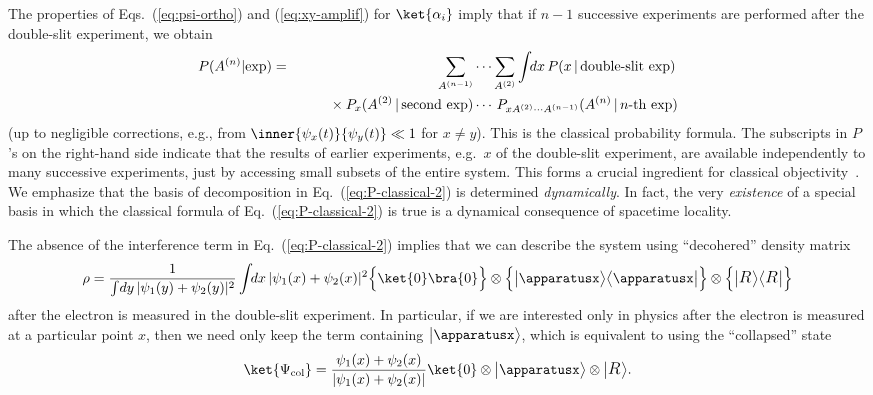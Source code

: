 \documentclass[12pt]{article}
\begin{document}
The properties of Eqs.~(\ref{eq:psi-ortho}) and (\ref{eq:xy-amplif}) 
for $\ket{\alpha_i}$ imply that if $n-1$ successive experiments are 
performed after the double-slit experiment, we obtain
%
\begin{eqnarray}
  P(A^{(n)}|{\rm exp}) &=& \sum_{A^{(n-1)}} \cdots \sum_{A^{(2)}} 
    \int\!\!dx\, P(x \,|\, \mbox{double-slit exp})\, 
\nonumber\\
  && {} \qquad \times P_x(A^{(2)} \,|\, \mbox{second exp}) \cdots\, 
    P_{x A^{(2)} \cdots A^{(n-1)}}(A^{(n)} \,|\, \mbox{$n$-th exp})
\label{eq:P-classical-2}
\end{eqnarray}
%
(up to negligible corrections, e.g., from $\inner{\psi_x(t)}{\psi_y(t)} 
\ll 1$ for $x \neq y$).  This is the classical probability formula.  The 
subscripts in $P$'s on the right-hand side indicate that the results of 
earlier experiments, e.g.\ $x$ of the double-slit experiment, are available 
independently to many successive experiments, just by accessing small 
subsets of the entire system.  This forms a crucial ingredient for 
classical objectivity~\cite{q-Darwinism}.  We emphasize that the 
basis of decomposition in Eq.~(\ref{eq:P-classical-2}) is determined 
{\it dynamically}.  In fact, the very {\it existence} of a special basis 
in which the classical formula of Eq.~(\ref{eq:P-classical-2}) is true 
is a dynamical consequence of spacetime locality.

The absence of the interference term in Eq.~(\ref{eq:P-classical-2}) 
implies that we can describe the system using ``decohered'' density matrix
%
\begin{equation}
  \rho = \frac{1}{\int\!dy\,|\psi_1(y) + \psi_2(y)|^2} 
    \int\!\!dx\, |\psi_1(x) + \psi_2(x)|^2 
    \Bigl\{ \ket{0} \bra{0} \Bigr\} \otimes \Big\{ \bigl|\apparatusx\bigr> 
    \bigl<\apparatusx\bigr| \Bigr\} \otimes \Bigl\{ 
    \bigl|\mbox{\large $R_{}$}\bigr> \bigl<\mbox{\large $R_{}$}\bigr| \Bigr\}
\label{eq:rho_fin}
\end{equation}
%
after the electron is measured in the double-slit experiment.  In particular, 
if we are interested only in physics after the electron is measured 
at a particular point $x$, then we need only keep the term containing 
$\bigl|\apparatusx\bigr>$, which is equivalent to using the ``collapsed'' 
state
%
\begin{equation}
  \ket{\Psi_{\rm col}} = \frac{\psi_1(x) + \psi_2(x)}{|\psi_1(x) + \psi_2(x)|} 
    \ket{0} \otimes \bigl|\apparatusx\bigr> 
    \otimes \bigl|\mbox{\large $R_{}$}\bigr>.
\label{eq:exp-fin-Cop}
\end{equation}
%
\end{document}
